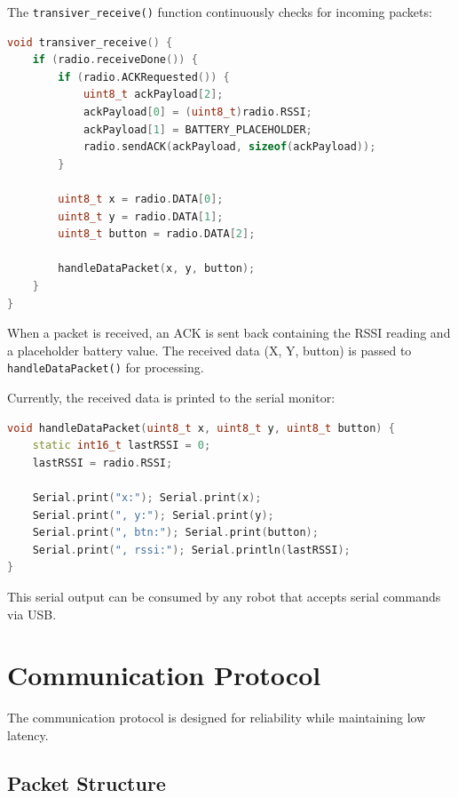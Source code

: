 The \texttt{transiver\_receive()} function continuously checks for incoming packets:

\begin{lstlisting}[language=C++]
void transiver_receive() {
    if (radio.receiveDone()) {
        if (radio.ACKRequested()) {
            uint8_t ackPayload[2];
            ackPayload[0] = (uint8_t)radio.RSSI;
            ackPayload[1] = BATTERY_PLACEHOLDER;
            radio.sendACK(ackPayload, sizeof(ackPayload));
        }

        uint8_t x = radio.DATA[0];
        uint8_t y = radio.DATA[1];
        uint8_t button = radio.DATA[2];

        handleDataPacket(x, y, button);
    }
}
\end{lstlisting}

When a packet is received, an ACK is sent back containing the RSSI reading and a placeholder battery value. The received data (X, Y, button) is passed to \texttt{handleDataPacket()} for processing.


Currently, the received data is printed to the serial monitor:

\begin{lstlisting}[language=C++]
void handleDataPacket(uint8_t x, uint8_t y, uint8_t button) {
    static int16_t lastRSSI = 0;
    lastRSSI = radio.RSSI;

    Serial.print("x:"); Serial.print(x);
    Serial.print(", y:"); Serial.print(y);
    Serial.print(", btn:"); Serial.print(button);
    Serial.print(", rssi:"); Serial.println(lastRSSI);
}
\end{lstlisting}

This serial output can be consumed by any robot that accepts serial commands via USB.

\section{Communication Protocol}

The communication protocol is designed for reliability while maintaining low latency.

\subsection{Packet Structure}

